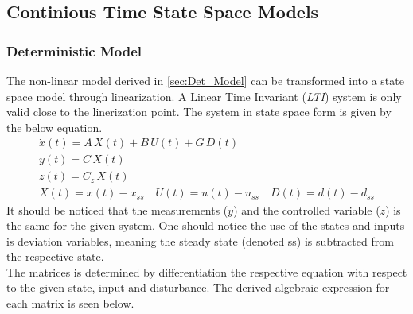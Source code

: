 \subsection{Continious Time State Space Models}
\subsubsection{Deterministic Model}
\label{sec:SS_det}
The non-linear model derived in \cref{sec:Det_Model} can be transformed into a state space model through linearization. A Linear Time Invariant (\textit{LTI}) system is only valid close to the linerization point. The system in state space form is given by the below equation.
\begin{equation}
    \begin{gathered}
        \dot{x}(t)=A\,X(t)+B\,U(t)+G\,D(t)\\
        y(t)=C\,X(t)\\
        z(t)=C_z\,X(t)\\
        X(t)=x(t)-x_{ss} \quad U(t)=u(t)-u_{ss} \quad D(t)=d(t)-d_{ss}
    \end{gathered}
\end{equation}
It should be noticed that the measurements ($y$) and the controlled variable ($z$) is the same for the given system. One should notice the use of the states and inputs is deviation variables, meaning the steady state (denoted ss) is subtracted from the respective state.\\
The matrices is determined by differentiation the respective equation with respect to the given state, input and disturbance. The derived algebraic expression for each matrix is seen below.
